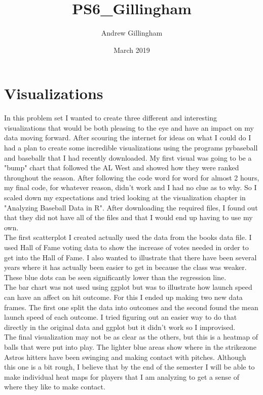 \documentclass{article}
\title{PS6_Gillingham}
\author{Andrew Gillingham}
\date{March 2019}
\begin{document}
\maketitle

\section{Visualizations}

\quad In this problem set I wanted to create three different and interesting visualizations that would be both pleasing to the eye and have an impact on my data moving forward. After scouring the internet for ideas on what I could do I had a plan to create some incredible visualizations using the programs pybaseball and baseballr that I had recently downloaded. My first visual was going to be a "bump" chart that followed the AL West and showed how they were ranked throughout the season. After following the code word for word for almost 2 hours, my final code, for whatever reason, didn't work and I had no clue as to why. So I scaled down my expectations and tried looking at the visualization chapter in "Analyzing Baseball Data in R". After downloading the required files, I found out that they did not have all of the files and that I would end up having to use my own.\\
The first scatterplot I created actually used the data from the books data file. I used Hall of Fame voting data to show the increase of votes needed in order to get into the Hall of Fame. I also wanted to illustrate that there have been several years where it has actually been easier to get in because the class was weaker. These blue dots can be seen significantly lower than the regression line. \\
The bar chart was not used using ggplot but was to illustrate how launch speed can have an affect on hit outcome. For this I ended up making two new data frames. The first one split the data into outcomes and the second found the mean launch speed of each outcome. I tried figuring out an easier way to do that directly in the original data and ggplot but it didn't work so I improvised. \\

The final visualization may not be as clear as the others, but this is a heatmap of balls that were put into play. The lighter blue areas show where in the strikezone Astros hitters have been swinging and making contact with pitches. Although this one is a bit rough, I believe that by the end of the semester I will be able to make individual heat maps for players that I am analyzing to get a sense of where they like to make contact.\\
\end{document}

